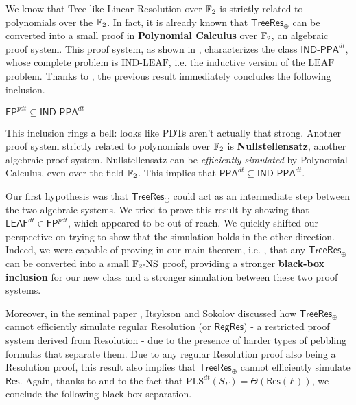 We know that Tree-like Linear Resolution over $\mathbb{F}_2$ is strictly related to polynomials over the $\mathbb{F}_2$. In fact, it is already known \cite{treeres2_in_pc} that $\mathsf{TreeRes}_\oplus$ can be converted into a small proof in \textbf{Polynomial Calculus} over $\mathbb{F}_2$, an algebraic proof system. This proof system, as shown in \cite{tfnp_characterization}, characterizes the  class $\mathsf{IND\text{-}PPA}^{dt}$, whose complete problem is $\mathrm{IND\text{-}LEAF}$, i.e. the inductive version of the $\mathrm{LEAF}$ problem. Thanks to , the previous result immediately concludes the following inclusion.

\begin{proposition}
    \label{fp_pdt_inside_ind_ppa_dt}
    $\mathsf{FP}^{pdt} \subseteq \mathsf{IND\text{-}PPA}^{dt}$
\end{proposition}

This inclusion rings a bell: looks like PDTs aren't actually that strong. Another proof system strictly related to polynomials over $\mathbb{F}_2$ is \textbf{Nullstellensatz}, another algebraic proof system. Nullstellensatz can be \textit{efficiently simulated} by Polynomial Calculus, even over the field $\mathbb{F}_2$. This implies that $\mathsf{PPA}^{dt} \subseteq \mathsf{IND\text{-}PPA}^{dt}$.

Our first hypothesis was that $\mathsf{TreeRes}_\oplus$ could act as an intermediate step between the two algebraic systems. We tried to prove this result by showing that $\mathsf{LEAF}^{dt} \in \mathsf{FP}^{pdt}$, which appeared to be out of reach. We quickly shifted our perspective on trying to show that the simulation holds in the other direction. Indeed, we were capable of proving in our main theorem, i.e. , that any $\mathsf{TreeRes}_\oplus$ can be converted into a small $\mathrm{\mathbb{F}_2\text{-}NS}$ proof, providing a stronger \textbf{black-box inclusion} for our new class and a stronger simulation between these two proof systems.

Moreover, in the seminal paper \cite{res_lin_2}, Itsykson and Sokolov discussed how $\mathsf{TreeRes}_\oplus$ cannot efficiently simulate regular Resolution (or $\mathsf{RegRes}$) - a restricted proof system derived from Resolution - due to the presence of harder types of pebbling formulas that separate them. Due to any regular Resolution proof also being a Resolution proof, this result also implies that $\mathsf{TreeRes}_\oplus$ cannot efficiently simulate $\mathsf{Res}$. Again, thanks to  and to the fact that $\mathrm{PLS}^{dt}(S_F) = \Theta(\mathsf{Res}(F))$, we conclude the following black-box separation.

